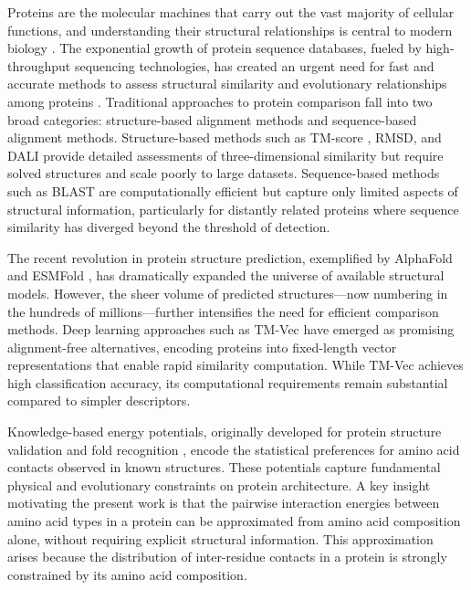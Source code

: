 \documentclass[11pt]{article}
\begin{document}
Proteins are the molecular machines that carry out the vast majority of cellular functions, and understanding their structural relationships is central to modern biology \citep{jumper2021}. The exponential growth of protein sequence databases, fueled by high-throughput sequencing technologies, has created an urgent need for fast and accurate methods to assess structural similarity and evolutionary relationships among proteins \citep{lin2023}. Traditional approaches to protein comparison fall into two broad categories: structure-based alignment methods and sequence-based alignment methods. Structure-based methods such as TM-score \citep{zhang2005}, RMSD, and DALI \citep{holm1993} provide detailed assessments of three-dimensional similarity but require solved structures and scale poorly to large datasets. Sequence-based methods such as BLAST \citep{altschul1990} are computationally efficient but capture only limited aspects of structural information, particularly for distantly related proteins where sequence similarity has diverged beyond the threshold of detection.

The recent revolution in protein structure prediction, exemplified by AlphaFold \citep{jumper2021} and ESMFold \citep{lin2023}, has dramatically expanded the universe of available structural models. However, the sheer volume of predicted structures---now numbering in the hundreds of millions---further intensifies the need for efficient comparison methods. Deep learning approaches such as TM-Vec \citep{hammad2023} have emerged as promising alignment-free alternatives, encoding proteins into fixed-length vector representations that enable rapid similarity computation. While TM-Vec achieves high classification accuracy, its computational requirements remain substantial compared to simpler descriptors.

Knowledge-based energy potentials, originally developed for protein structure validation and fold recognition \citep{sippl1990}, encode the statistical preferences for amino acid contacts observed in known structures. These potentials capture fundamental physical and evolutionary constraints on protein architecture. A key insight motivating the present work is that the pairwise interaction energies between amino acid types in a protein can be approximated from amino acid composition alone, without requiring explicit structural information. This approximation arises because the distribution of inter-residue contacts in a protein is strongly constrained by its amino acid composition.
\end{document}
